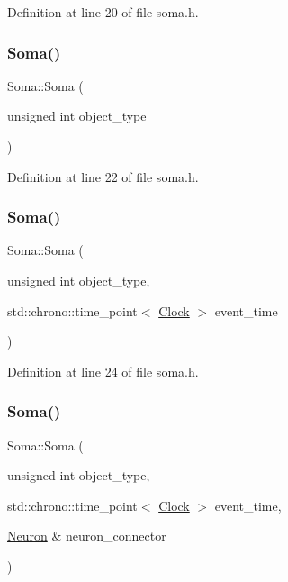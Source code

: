 Definition at line 20 of file soma.\+h.

\mbox{\label{class_soma_a5c0fb24d35ef360cdb830887952f44e5}} 
\subsubsection{\texorpdfstring{Soma()}{Soma()}\hspace{0.1cm}{\footnotesize\ttfamily [2/4]}}
{\footnotesize\ttfamily Soma\+::\+Soma (\begin{DoxyParamCaption}\item[{unsigned int}]{object\+\_\+type }\end{DoxyParamCaption})\hspace{0.3cm}{\ttfamily [inline]}}



Definition at line 22 of file soma.\+h.

\mbox{\label{class_soma_a9c9388e5b6562c39689768856d59ca51}} 
\subsubsection{\texorpdfstring{Soma()}{Soma()}\hspace{0.1cm}{\footnotesize\ttfamily [3/4]}}
{\footnotesize\ttfamily Soma\+::\+Soma (\begin{DoxyParamCaption}\item[{unsigned int}]{object\+\_\+type,  }\item[{std\+::chrono\+::time\+\_\+point$<$ \mbox{\hyperlink{universe_8h_a0ef8d951d1ca5ab3cfaf7ab4c7a6fd80}{Clock}} $>$}]{event\+\_\+time }\end{DoxyParamCaption})\hspace{0.3cm}{\ttfamily [inline]}}



Definition at line 24 of file soma.\+h.

\mbox{\label{class_soma_a451e3918aa5f3ec5670fa08d4d710dd6}} 
\subsubsection{\texorpdfstring{Soma()}{Soma()}\hspace{0.1cm}{\footnotesize\ttfamily [4/4]}}
{\footnotesize\ttfamily Soma\+::\+Soma (\begin{DoxyParamCaption}\item[{unsigned int}]{object\+\_\+type,  }\item[{std\+::chrono\+::time\+\_\+point$<$ \mbox{\hyperlink{universe_8h_a0ef8d951d1ca5ab3cfaf7ab4c7a6fd80}{Clock}} $>$}]{event\+\_\+time,  }\item[{\mbox{\hyperlink{class_neuron}{Neuron}} \&}]{neuron\+\_\+connector }\end{DoxyParamCaption})\hspace{0.3cm}{\ttfamily [inline]}}



